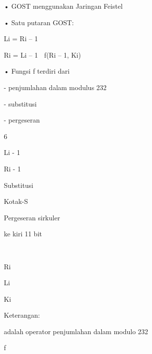 \documentclass{article}
\begin{document}

• GOST menggunakan Jaringan Feistel 

• Satu putaran GOST:

  Li = Ri – 1 

  Ri = Li – 1  f(Ri – 1, Ki) 

• Fungsi f terdiri dari 

 - penjumlahan dalam modulus 232

 - substitusi

 - pergeseran

6

Li - 1

Ri - 1

Substitusi

Kotak-S

Pergeseran sirkuler

ke kiri 11 bit



Ri

Li

Ki

Keterangan:

adalah operator penjumlahan dalam modulo 232

f
\end{document}
